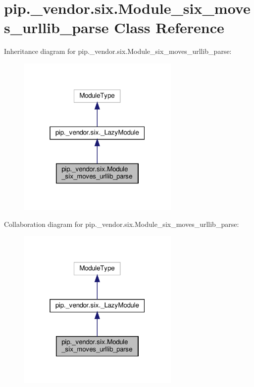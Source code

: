 \hypertarget{classpip_1_1__vendor_1_1six_1_1Module__six__moves__urllib__parse}{}\section{pip.\+\_\+vendor.\+six.\+Module\+\_\+six\+\_\+moves\+\_\+urllib\+\_\+parse Class Reference}
\label{classpip_1_1__vendor_1_1six_1_1Module__six__moves__urllib__parse}


Inheritance diagram for pip.\+\_\+vendor.\+six.\+Module\+\_\+six\+\_\+moves\+\_\+urllib\+\_\+parse\+:
\nopagebreak
\begin{figure}[H]
\begin{center}
\leavevmode
\includegraphics[width=223pt]{classpip_1_1__vendor_1_1six_1_1Module__six__moves__urllib__parse__inherit__graph}
\end{center}
\end{figure}


Collaboration diagram for pip.\+\_\+vendor.\+six.\+Module\+\_\+six\+\_\+moves\+\_\+urllib\+\_\+parse\+:
\nopagebreak
\begin{figure}[H]
\begin{center}
\leavevmode
\includegraphics[width=223pt]{classpip_1_1__vendor_1_1six_1_1Module__six__moves__urllib__parse__coll__graph}
\end{center}
\end{figure}
